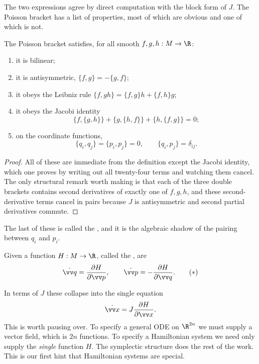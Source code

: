 The two expressions agree by direct computation with the block form of $J$. The Poisson bracket has a list of properties, most of which are obvious and one of which is not.

\begin{proposition}
	The Poisson bracket satisfies, for all smooth $f, g, h : M \to \R$:
	\begin{enumerate}[label=(\roman*)]
		\item it is bilinear;
		\item it is antisymmetric, $\{f,g\} = -\{g,f\}$;
		\item it obeys the Leibniz rule $\{f, gh\} = \{f,g\}h + \{f,h\}g$;
		\item it obeys the Jacobi identity
		$$
		\{f, \{g,h\}\} + \{g, \{h,f\}\} + \{h, \{f,g\}\} = 0;
		$$
		\item on the coordinate functions,
		$$
		\{q_i, q_j\} = \{p_i, p_j\} = 0, \qquad \{q_i, p_j\} = \delta_{ij}.
		$$
	\end{enumerate}
\end{proposition}
\begin{proof}
	All of these are immediate from the definition except the Jacobi identity, which one proves by writing out all twenty-four terms and watching them cancel. The only structural remark worth making is that each of the three double brackets contains second derivatives of exactly one of $f,g,h$, and these second-derivative terms cancel in pairs because $J$ is antisymmetric and second partial derivatives commute.
\end{proof}

The last of these is called the , and it is the algebraic shadow of the pairing between $q_i$ and $p_i$.

\begin{definition}
	Given a function $H : M \to \R$, called the ,  are
	\begin{equation*}
	\dot{\vv q} = \frac{\partial H}{\partial \vv p}, \qquad \dot{\vv p} = -\frac{\partial H}{\partial \vv q}. \tag{$*$}
	\end{equation*}
\end{definition}

In terms of $J$ these collapse into the single equation
$$
\dot{\vv x} = J\frac{\partial H}{\partial \vv x}.
$$
This is worth pausing over. To specify a general ODE on $\R^{2n}$ we must supply a vector field, which is $2n$ functions. To specify a Hamiltonian system we need only supply the \emph{single} function $H$. The symplectic structure does the rest of the work. This is our first hint that Hamiltonian systems are special.

